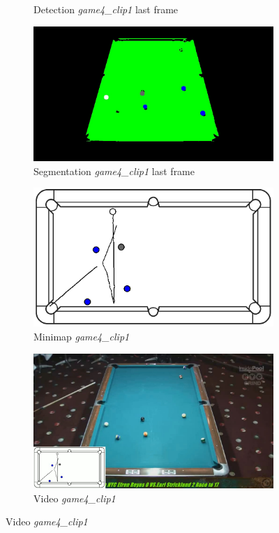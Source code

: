 \begin{figure}[H]
\begin{subfigure}[b]{0.48\textwidth}
		\caption{Detection \textit{game4\_clip1} last frame}
		\label{fig: game4_clip1_last_frame_detected}
	\end{subfigure}
	\begin{subfigure}[b]{0.48\textwidth}
		\centering
		\includegraphics[width=\textwidth]{images/Segmentation/game4_clip1_segmented_balls_last_frame.jpg}
		\caption{Segmentation \textit{game4\_clip1} last frame}
		\label{fig: game4_clip1_last_frame_segmented}
	\end{subfigure}
	\begin{subfigure}[b]{0.48\textwidth}
		\centering
		\includegraphics[width=\textwidth]{images/AllMinimap/game4_clip1_minimap.png}
		\caption{Minimap \textit{game4\_clip1}}
		\label{fig: game4_clip1_minimap}
	\end{subfigure}
	\begin{subfigure}[b]{0.48\textwidth}
		\centering
		\includegraphics[width=\textwidth]{images/Video/game4_clip1_video.jpg}
		\caption{Video \textit{game4\_clip1}}
		\label{fig: game4_clip1_video}
	\end{subfigure}


\end{figure}
